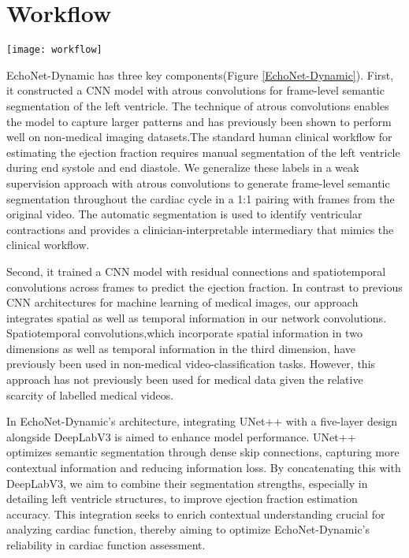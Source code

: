 
\vfill
\section{Workflow}

\begin{figure*}[h]
\centering
\texttt{[image: workflow]}
\caption{EchoNet-Dynamic architecture}
\label{EchoNet-Dynamic}
\end{figure*}


EchoNet-Dynamic has three key components(Figure \ref{EchoNet-Dynamic}). First, it constructed a CNN model with atrous convolutions for frame-level semantic segmentation of the left ventricle. The technique of atrous convolutions enables the model to capture larger patterns and has previously been shown to perform well on non-medical imaging datasets.The standard human clinical workflow for estimating the ejection fraction requires manual segmentation of the left ventricle during end systole and end diastole. We generalize these labels in a weak supervision approach with atrous convolutions to generate frame-level semantic segmentation throughout the cardiac cycle in a 1:1 pairing with frames from the original video. The automatic segmentation is used to identify ventricular contractions and provides a clinician-interpretable intermediary that mimics the clinical workflow.

Second, it trained a CNN model with residual connections and spatiotemporal convolutions across frames to predict the ejection fraction. In contrast to previous CNN architectures for machine learning of medical images, our approach integrates spatial as well as temporal information in our network convolutions. Spatiotemporal convolutions,which incorporate spatial information in two dimensions as well as temporal information in the third dimension, have previously been used in non-medical video-classification tasks. However, this approach has not previously been used for medical data given the relative scarcity of labelled medical videos. 

In EchoNet-Dynamic's architecture, integrating UNet++ with a five-layer design alongside DeepLabV3 is aimed to enhance model performance. UNet++ optimizes semantic segmentation through dense skip connections, capturing more contextual information and reducing information loss. By concatenating this with DeepLabV3, we aim to combine their segmentation strengths, especially in detailing left ventricle structures, to improve ejection fraction estimation accuracy. This integration seeks to enrich contextual understanding crucial for analyzing cardiac function, thereby aiming to optimize EchoNet-Dynamic's reliability in cardiac function assessment.

